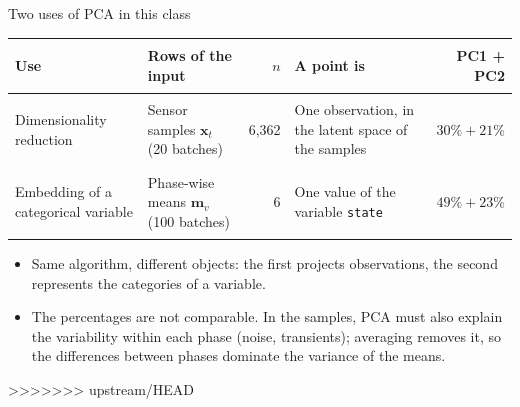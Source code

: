 \begin{frame}{Two uses of PCA in this class}
\begingroup\footnotesize
\renewcommand{\arraystretch}{1.5}
\begin{tabularx}{\textwidth}{>{\bfseries\raggedright\arraybackslash}p{} >{\raggedright\arraybackslash}X r >{\raggedright\arraybackslash}X r}
Use & Rows of the input & $n$ & A point is & PC1 + PC2 \\
\toprule
Dimensionality reduction & Sensor samples $\mathbf{x}_t$ (20 batches) & 6{,}362 & One observation, in the latent space of the samples & $30\% + 21\%$ \\
Embedding of a categorical variable & Phase-wise means $\mathbf{m}_v$ (100 batches) & 6 & One value of the variable \texttt{state} & $49\% + 23\%$ \\
\bottomrule
\end{tabularx}
\par\endgroup
\vspace{0.8em}
\begingroup\small
\begin{itemize}
\item Same algorithm, different objects: the first projects observations, the second represents the categories of a variable.
\item The percentages are not comparable. In the samples, PCA must also explain the variability within each phase (noise, transients); averaging removes it, so the differences between phases dominate the variance of the means.
\end{itemize}
>>>>>>> upstream/HEAD
\par\endgroup
\coursefooter
\end{frame}

